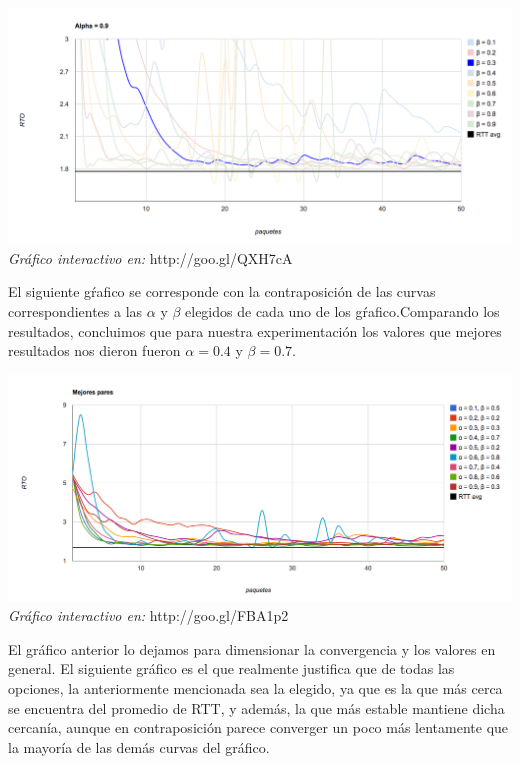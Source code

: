 \begin{center}
	\includegraphics[scale=0.35]{graphics/rto_vs_paquetes_a_9.png}
	\textit{Gráfico interactivo en:} http://goo.gl/QXH7cA
\end{center}

\indent

\indent El siguiente gŕafico se corresponde con la contraposición de las curvas correspondientes a las $\alpha$ y $\beta$ elegidos de cada uno de los gŕafico.Comparando los resultados, concluimos que para nuestra experimentación los valores que mejores resultados nos dieron fueron $\alpha = 0.4$ y $\beta = 0.7$.\\ 

\begin{center}
	\includegraphics[scale=0.35]{graphics/best_pairs.png}
	\textit{Gráfico interactivo en:} http://goo.gl/FBA1p2
\end{center}

\indent El gráfico anterior lo dejamos para dimensionar la convergencia y los valores en general. El siguiente gráfico es el que realmente justifica que de todas las opciones, la anteriormente mencionada sea la elegido, ya que es la que más cerca se encuentra del promedio de RTT, y además, la que más estable mantiene dicha cercanía, aunque en contraposición parece converger un poco más lentamente que la mayoría de las demás curvas del gráfico.\\

